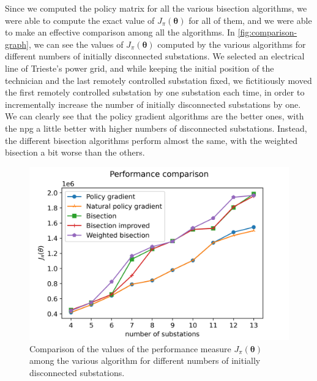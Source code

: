 Since we computed the policy matrix for all the various bisection algorithms, we were able to compute the exact value of $J_\pi (\boldsymbol \theta)$ for all of them, and we were able to make an effective comparison among all the algorithms. In \autoref{fig:comparison-graph}, we can see the values of $J_\pi(\boldsymbol \theta)$ computed by the various algorithms for different numbers of initially disconnected substations. We selected an electrical line of Trieste's power grid, and while keeping the initial position of the technician and the last remotely controlled substation fixed, we fictitiously moved the first remotely controlled substation by one substation each time, in order to incrementally increase the number of initially disconnected substations by one.
We can clearly see that the policy gradient algorithms are the better ones, with the \acrshort{npg} a little better with higher numbers of disconnected substations. Instead, the different bisection algorithms perform almost the same, with the weighted bisection a bit worse than the others.

\begin{figure}[hb]
    \centering
    \includegraphics[scale=0.8]{chapters/figures/comparison_graph.png}
    \caption{Comparison of the values of the performance measure $J_\pi (\boldsymbol \theta)$ among the various algorithm for different numbers of initially disconnected substations.}
    \label{fig:comparison-graph}
\end{figure}

